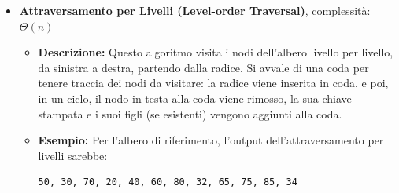 \begin{itemize}
    \item \textbf{Attraversamento per Livelli (Level-order Traversal)}, complessità: $\Theta(n)$
    \begin{itemize}
        \item \textbf{Descrizione:} Questo algoritmo visita i nodi dell'albero livello per livello, da sinistra a destra, partendo dalla radice. Si avvale di una coda per tenere traccia dei nodi da visitare: la radice viene inserita in coda, e poi, in un ciclo, il nodo in testa alla coda viene rimosso, la sua chiave stampata e i suoi figli (se esistenti) vengono aggiunti alla coda.

        \item \textbf{Esempio:} Per l'albero di riferimento, l'output dell'attraversamento per livelli sarebbe:
        \begin{verbatim}
50, 30, 70, 20, 40, 60, 80, 32, 65, 75, 85, 34
        \end{verbatim}
    \end{itemize}
\end{itemize}